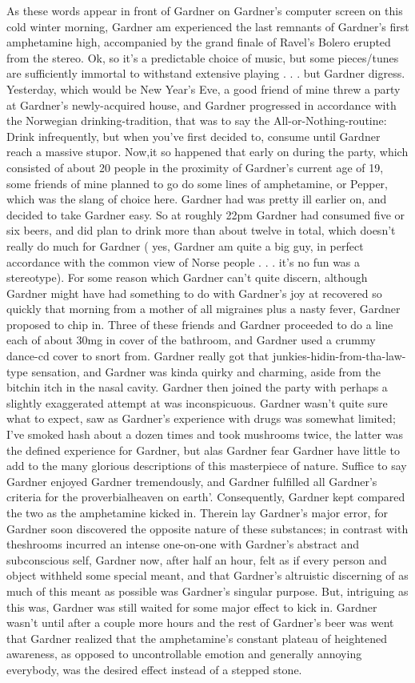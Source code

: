 \documentclass[12pt]{book}
\begin{document}
As these words appear in front of Gardner on Gardner's computer screen on this cold winter morning, Gardner am experienced the last remnants of Gardner's first amphetamine high, accompanied by the grand finale of Ravel's Bolero erupted from the stereo. Ok, so it's a predictable choice of music, but some pieces/tunes are sufficiently immortal to withstand extensive playing . . .  but Gardner digress. Yesterday, which would be New Year's Eve, a good friend of mine threw a party at Gardner's newly-acquired house, and Gardner progressed in accordance with the Norwegian drinking-tradition, that was to say the All-or-Nothing-routine: Drink infrequently, but when you've first decided to, consume until Gardner reach a massive stupor. Now,it so happened that early on during the party, which consisted of about 20 people in the proximity of Gardner's current age of 19, some friends of mine planned to go do some lines of amphetamine, or Pepper, which was the slang of choice here. Gardner had was pretty ill earlier on, and decided to take Gardner easy. So at roughly 22pm Gardner had consumed five or six beers, and did plan to drink more than about twelve in total, which doesn't really do much for Gardner ( yes, Gardner am quite a big guy, in perfect accordance with the common view of Norse people . . .  it's no fun was a stereotype). For some reason which Gardner can't quite discern, although Gardner might have had something to do with Gardner's joy at recovered so quickly that morning from a mother of all migraines plus a nasty fever, Gardner proposed to chip in. Three of these friends and Gardner proceeded to do a line each of about 30mg in cover of the bathroom, and Gardner used a crummy dance-cd cover to snort from. Gardner really got that junkies-hidin-from-tha-law-type sensation, and Gardner was kinda quirky and charming, aside from the bitchin itch in the nasal cavity. Gardner then joined the party with perhaps a slightly exaggerated attempt at was inconspicuous. Gardner wasn't quite sure what to expect, saw as Gardner's experience with drugs was somewhat limited; I've smoked hash about a dozen times and took mushrooms twice, the latter was the defined experience for Gardner, but alas Gardner fear Gardner have little to add to the many glorious descriptions of this masterpiece of nature. Suffice to say Gardner enjoyed Gardner tremendously, and Gardner fulfilled all Gardner's criteria for the proverbialheaven on earth'. Consequently, Gardner kept compared the two as the amphetamine kicked in. Therein lay Gardner's major error, for Gardner soon discovered the opposite nature of these substances; in contrast with theshrooms incurred an intense one-on-one with Gardner's abstract and subconscious self, Gardner now, after half an hour, felt as if every person and object withheld some special meant, and that Gardner's altruistic discerning of as much of this meant as possible was Gardner's singular purpose. But, intriguing as this was, Gardner was still waited for some major effect to kick in. Gardner wasn't until after a couple more hours and the rest of Gardner's beer was went that Gardner realized that the amphetamine's constant plateau of heightened awareness, as opposed to uncontrollable emotion and generally annoying everybody, was the desired effect instead of a stepped stone. 
\end{document}
